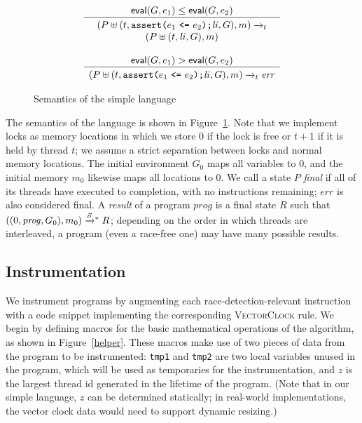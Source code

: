 \documentclass[preprint, 9pt]{sigplanconf}
\newcommand{\VCalg}{\textsc{VectorClock}\xspace}
\newcommand{\assert}[2]{\texttt{assert(}#1\ \texttt{<=}\ #2\texttt{)}}
\newcommand{\cfg}[2]{\ensuremath{(#1, #2)}}
\newcommand{\anarrow}[2]{\ensuremath{\xrightarrow{#2}_{#1}}}
\newcommand{\execstar}[4]{\ensuremath{\cfg{#1}{#2} \tto{#3} #4}}
\newcommand{\tto}[1]{\mathrel{
  \vphantom{\xrightarrow{#1}}
  \smash{\xrightarrow{#1}}
  \vphantom{\to}^{*}}
}
\begin{document}
\begin{figure}[tb]
\[\begin{array}{c}
\multicolumn{1}{c}{\mathsf{eval}(G, e_1) \le \mathsf{eval}(G, e_2)}
\\ \hline \rule{0pt}{2.5ex}
\cfg{P \uplus (t, \assert{e_1}{e_2}\texttt{;} \mathit{li}, G)}{m}
\anarrow{t}{} \\
\cfg{P \uplus (t, \mathit{li}, G)}{m}
\\\\

\multicolumn{1}{c}{\mathsf{eval}(G, e_1) > \mathsf{eval}(G, e_2)}
\\ \hline \rule{0pt}{2.5ex}
\cfg{P \uplus (t, \assert{e_1}{e_2}\texttt{;} \mathit{li}, G)}{m}
\anarrow{t}{} 
\mathit{err}
\end{array}
\]







\caption{Semantics of the simple language}
\label{semantics}
\end{figure}
The semantics of the language is shown in Figure~\ref{semantics}. Note that we implement locks as memory locations in which we store 0 if the lock is free or $t + 1$ if it is held by thread $t$; we assume a strict separation between locks and normal memory locations. The initial environment $G_0$ maps all variables to 0, and the initial memory $m_0$ likewise maps all locations to 0. We call a state $P$ \emph{final} if all of its threads have executed to completion, with no instructions remaining; $\mathit{err}$ is also considered final. A \emph{result} of a program $\mathit{prog}$ is a final state $R$ such that \execstar{(0, \mathit{prog}, G_0)}{m_0}{\vec{o}}{R}; depending on the order in which threads are interleaved, a program (even a race-free one) may have many possible results.

\subsection{Instrumentation}
We instrument programs by augmenting each race-detection-relevant instruction with a code snippet implementing the corresponding \VCalg rule. We begin by defining macros for the basic mathematical operations of the algorithm, as shown in Figure~\ref{helper}. These macros make use of two pieces of data from the program to be instrumented: \texttt{tmp1} and \texttt{tmp2} are two local variables unused in the program, which will be used as temporaries for the instrumentation, and $z$ is the largest thread id generated in the lifetime of the program. (Note that in our simple language, $z$ can be determined statically; in real-world implementations, the vector clock data would need to support dynamic resizing.)
\end{document}
